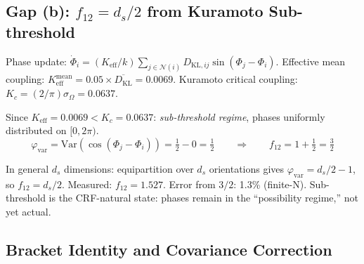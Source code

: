 \documentclass[12pt, a4paper]{article}
\begin{document}
\subsection{Gap (b): $f_{12} = d_s/2$ from Kuramoto Sub-threshold}

\begin{derivedbox}[title={$f_{12} = 3/2$ from Kuramoto Dynamics --- Derived}]
Phase update: $\dot{\Phi}_i = (K_{\mathrm{eff}}/k)\sum_{j\in\mathcal{N}(i)}D_{\mathrm{KL},ij}\sin(\Phi_j - \Phi_i)$.
Effective mean coupling: $K_{\mathrm{eff}}^{\mathrm{mean}} = 0.05\times\overline{D_{\mathrm{KL}}} = 0.0069$.
Kuramoto critical coupling: $K_c = (2/\pi)\sigma_\Omega = 0.0637$.

Since $K_{\mathrm{eff}} = 0.0069 < K_c = 0.0637$: \emph{sub-threshold regime}, phases uniformly
distributed on $[0,2\pi)$.
\[
  \varphi_{\mathrm{var}} = \mathrm{Var}(\cos(\Phi_j - \Phi_i))
  = \tfrac{1}{2} - 0 = \tfrac{1}{2}
  \qquad\Rightarrow\qquad
  f_{12} = 1 + \tfrac{1}{2} = \tfrac{3}{2}
\]

In general $d_s$ dimensions: equipartition over $d_s$ orientations gives
$\varphi_{\mathrm{var}} = d_s/2 - 1$, so $f_{12} = d_s/2$.
Measured: $f_{12} = 1.527$. Error from $3/2$: 1.3\% (finite-N). Sub-threshold is the
CRF-natural state: phases remain in the ``possibility regime,'' not yet actual.
\end{derivedbox}

\subsection{Bracket Identity and Covariance Correction}
\end{document}
